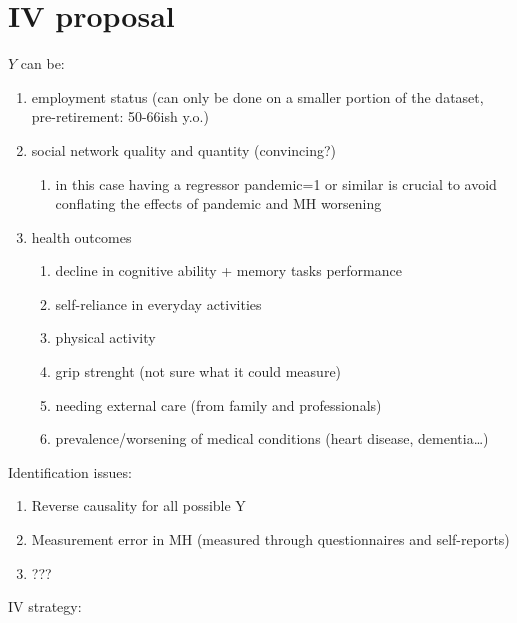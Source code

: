 \documentclass{article}
\begin{document}
    \section{IV proposal}
    $Y$ can be:
    \begin{enumerate}
        \item employment status (can only be done on a smaller portion of the dataset, pre-retirement: 50-66ish y.o.)
        \item social network quality and quantity (convincing?)
            \begin{enumerate}
                \item in this case having a regressor pandemic=1 or similar is crucial to avoid conflating the effects of pandemic and MH worsening 
            \end{enumerate}
        \item health outcomes
            \begin{enumerate}
                \item decline in cognitive ability + memory tasks performance
                \item self-reliance in everyday activities
                \item physical activity 
                \item grip strenght (not sure what it could measure)
                \item needing external care (from family and professionals)
                \item prevalence/worsening of medical conditions (heart disease, dementia\dots)
            \end{enumerate}
    \end{enumerate}
Identification issues:
\begin{enumerate}
    \item Reverse causality for all possible Y 
    \item Measurement error in MH (measured through questionnaires and self-reports)
    \item ???
\end{enumerate}
IV strategy:
\end{document}
